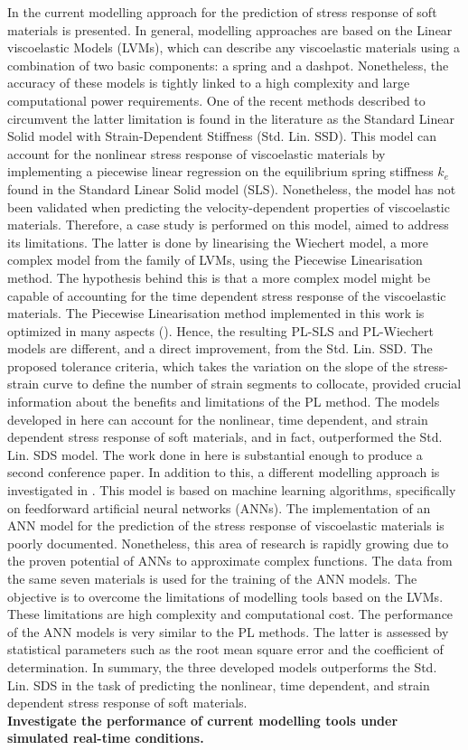 In  the current modelling approach for the prediction of stress response of soft materials is presented. In general, modelling approaches are based on the Linear viscoelastic Models (LVMs), which can describe any viscoelastic materials using a combination of two basic components: a spring and a dashpot. Nonetheless, the accuracy of these models is tightly linked to a high complexity and large computational power requirements. One of the recent methods described to circumvent the latter limitation is found in the literature as the Standard Linear Solid model with Strain-Dependent Stiffness (Std. Lin. SSD). This model can account for the nonlinear stress response of viscoelastic materials by implementing a piecewise linear regression on the equilibrium spring stiffness $k_e$ found in the Standard Linear Solid model (SLS). Nonetheless, the model has not been validated when predicting the velocity-dependent properties of viscoelastic materials. Therefore, a case study is performed on this model, aimed to address its limitations. The latter is done by linearising the Wiechert model, a more complex model from the family of LVMs, using the Piecewise Linearisation method. The hypothesis behind this is that a more complex model might be capable of accounting for the time dependent stress response of the viscoelastic materials. The Piecewise Linearisation method implemented in this work is optimized in many aspects (). Hence, the resulting PL-SLS and PL-Wiechert models are different, and a direct improvement, from the Std. Lin. SSD. The proposed tolerance criteria, which takes the variation on the slope of the stress-strain curve to define the number of strain segments to collocate, provided crucial information about the benefits and limitations of the PL method. The models developed in here can account for the nonlinear, time dependent, and strain dependent stress response of soft materials, and in fact, outperformed the Std. Lin. SDS model. The work done in here is substantial enough to produce a second conference paper. In addition to this, a different modelling approach is investigated in . This model is based on machine learning algorithms, specifically on feedforward artificial neural networks (ANNs). The implementation of an ANN model for the prediction of the stress response of viscoelastic materials is poorly documented. Nonetheless, this area of research is rapidly growing due to the proven potential of ANNs to approximate complex functions. The data from the same seven materials is used for the training of the ANN models. The objective is to overcome the limitations of modelling tools based on the LVMs. These limitations are high complexity and computational cost. The performance of the ANN models is very similar to the PL methods. The latter is assessed by statistical parameters such as the root mean square error and the coefficient of determination. In summary, the three developed models outperforms the Std. Lin. SDS in the task of predicting the nonlinear, time dependent, and strain dependent stress response of soft materials.
\\[1em]
\noindent \textbf{\large{ Investigate the performance of current modelling tools under simulated real-time conditions.}}

